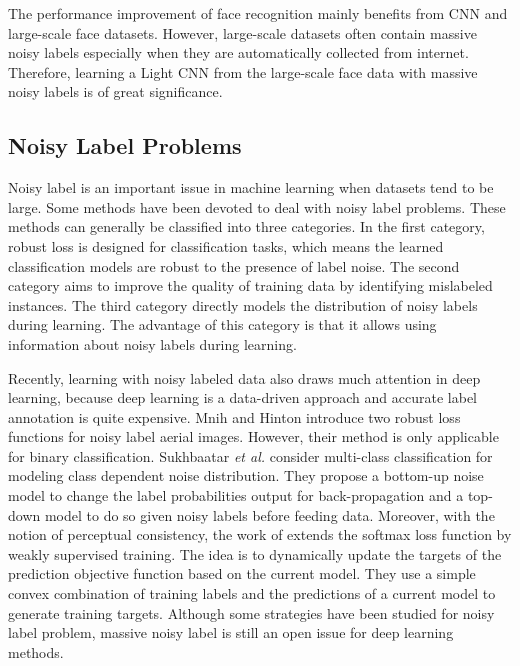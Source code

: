 \documentclass[journal,transmag]{IEEEtran}
\begin{document}
The performance improvement of face recognition mainly benefits from CNN and large-scale face datasets. However, large-scale datasets often contain massive noisy labels especially when they are automatically collected from internet. Therefore, learning a Light CNN from the large-scale face data with massive noisy labels is of great significance.



\subsection{Noisy Label Problems}

Noisy label is an important issue in machine learning when datasets tend to be large. Some methods \cite{DBLP:journals/tnn/FrenayV14} have been devoted to deal with noisy label problems. These methods can generally be classified into three categories. In the first category, robust loss \cite{DBLP:conf/acl/BeigmanK09} is designed for classification tasks, which means the learned classification models are robust to the presence of label noise.  The second category \cite{DBLP:conf/icml/WilsonM97} aims to improve the quality of training data by identifying mislabeled instances. The third category \cite{DBLP:conf/icml/LawrenceS01} directly models the distribution of noisy labels during learning. The advantage of this category is that it allows using information about noisy labels during learning.

Recently, learning with noisy labeled data also draws much attention in deep learning, because deep learning is a data-driven approach and accurate label annotation is quite expensive. Mnih and Hinton \cite{DBLP:conf/icml/MnihH12} introduce two robust loss functions for noisy label aerial images. However, their method is only applicable for binary classification.
Sukhbaatar \emph{et al.} \cite{DBLP:journals/corr/SukhbaatarF14} consider multi-class classification for modeling class dependent noise distribution. They propose a bottom-up noise model to change the label probabilities output for back-propagation and a top-down model to do so given noisy labels before feeding data.
Moreover, with the notion of perceptual consistency, the work of \cite{DBLP:journals/corr/ReedLASER14} extends the softmax loss function by weakly supervised training. The idea is to dynamically update the targets of the prediction objective function based on the current model. They use a simple convex combination of training labels and the predictions of a current model to generate training targets. Although some strategies have been studied for noisy label problem, massive noisy label is still an open issue for deep learning methods.
\end{document}

